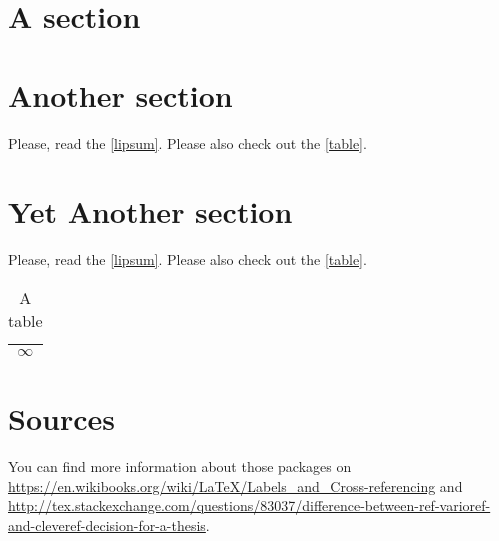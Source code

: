\documentclass{article}
\begin{document}
\section{A section}
\label{lipsum}
\lipsum[1]

\section{Another section}

Please, read the \vref{lipsum}. Please also check out the \vref{table}.

\newpage

\section{Yet Another section}

Please, read the \vref{lipsum}. Please also check out the \vref{table}.

\begin{table}[b]
\centering
\begin{tabular}{|c|}
\hline
$\infty$ \\
\hline
\end{tabular}
\caption{A table}
\label{table}
\end{table}

\section{Sources}

You can find more information about those packages on \url{https://en.wikibooks.org/wiki/LaTeX/Labels_and_Cross-referencing} and \url{http://tex.stackexchange.com/questions/83037/difference-between-ref-varioref-and-cleveref-decision-for-a-thesis}.
\end{document}
